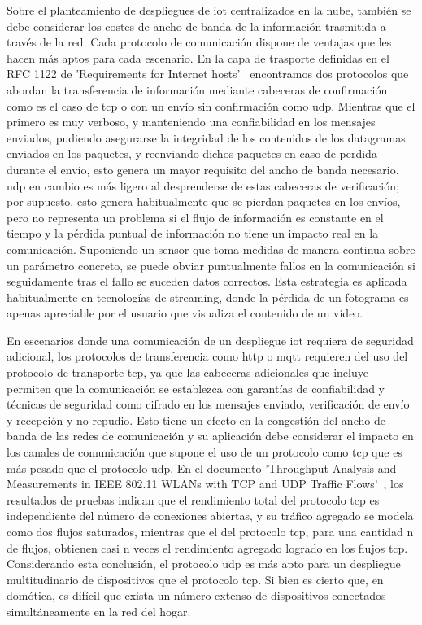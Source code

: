 Sobre el planteamiento de despliegues de \gls{iot} centralizados en la nube, también se debe considerar los costes de ancho de banda de la información trasmitida a través de la red. Cada protocolo de comunicación dispone de ventajas que les hacen más aptos para cada escenario. En la capa de trasporte definidas en el RFC 1122 de 'Requirements for Internet hosts'~\cite{braden1989requirements} encontramos dos protocolos que abordan la transferencia de información mediante cabeceras de confirmación como es el caso de \gls{tcp} o con un envío sin confirmación como \gls{udp}. Mientras que el primero es muy verboso, y manteniendo una confiabilidad en los mensajes enviados, pudiendo asegurarse la integridad de los contenidos de los datagramas enviados en los paquetes, y reenviando dichos paquetes en caso de perdida durante el envío, esto genera un mayor requisito del ancho de banda necesario. \gls{udp} en cambio es más ligero al desprenderse de estas cabeceras de verificación; por supuesto, esto genera habitualmente que se pierdan paquetes en los envíos, pero no representa un problema si el flujo de información es constante en el tiempo y la pérdida puntual de información no tiene un impacto real en la comunicación. Suponiendo un sensor que toma medidas de manera continua sobre un parámetro concreto, se puede obviar puntualmente fallos en la comunicación si seguidamente tras el fallo se suceden datos correctos. Esta estrategia es aplicada habitualmente en tecnologías de streaming, donde la pérdida de un fotograma es apenas apreciable por el usuario que visualiza el contenido de un vídeo. 

\vspace{1cm}

En escenarios donde una comunicación de un despliegue \gls{iot} requiera de seguridad adicional, los protocolos de transferencia como \gls{http} o \gls{mqtt} requieren del uso del protocolo de transporte \gls{tcp}, ya que las cabeceras adicionales que incluye permiten que la comunicación se establezca con garantías de confiabilidad y técnicas de seguridad como cifrado en los mensajes enviado, verificación de envío y recepción y no repudio. Esto tiene un efecto en la congestión del ancho de banda de las redes de comunicación y su aplicación debe considerar el impacto en los canales de comunicación que supone el uso de un protocolo como \gls{tcp} que es más pesado que el protocolo \gls{udp}. En el documento 'Throughput Analysis and Measurements in IEEE 802.11 WLANs with TCP and UDP Traffic Flows'~\cite{bruno2007throughput}, los resultados de pruebas indican que el rendimiento total del protocolo \gls{tcp} es independiente del número de conexiones abiertas, y su tráfico agregado se modela como dos flujos saturados, mientras que el del protocolo \gls{tcp}, para una cantidad n de flujos, obtienen casi n veces el rendimiento agregado logrado en los flujos \gls{tcp}. Considerando esta conclusión, el protocolo \gls{udp} es más apto para un despliegue multitudinario de dispositivos que el protocolo \gls{tcp}. Si bien es cierto que, en domótica, es difícil que exista un número extenso de dispositivos conectados simultáneamente en la red del hogar.

